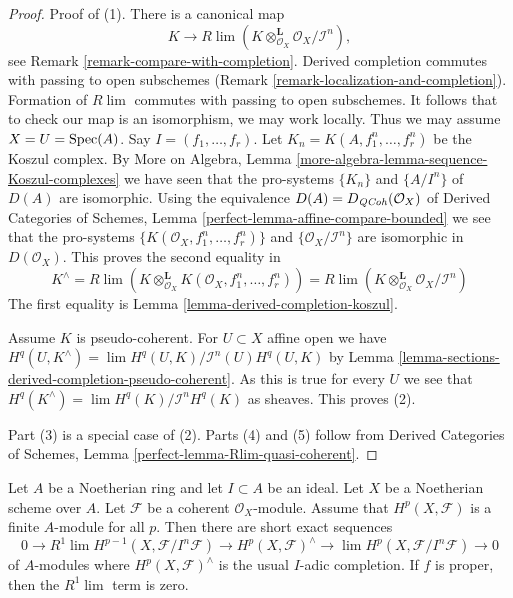 \begin{proof}
Proof of (1). There is a canonical map
$$
K \longrightarrow
R\lim (K \otimes_{\mathcal{O}_X}^\mathbf{L} \mathcal{O}_X/\mathcal{I}^n),
$$
see Remark \ref{remark-compare-with-completion}.
Derived completion commutes with passing to open subschemes
(Remark \ref{remark-localization-and-completion}).
Formation of $R\lim$ commutes with passing to open subschemes.
It follows that to check our map is an isomorphism, we may work locally.
Thus we may assume $X = U = \mathop{\mathrm{Spec}}(A)$.
Say $I = (f_1, \ldots, f_r)$. Let
$K_n = K(A, f_1^n, \ldots, f_r^n)$ be the Koszul complex.
By More on Algebra, Lemma \ref{more-algebra-lemma-sequence-Koszul-complexes}
we have seen that the pro-systems $\{K_n\}$ and
$\{A/I^n\}$ of $D(A)$ are isomorphic.
Using the equivalence $D(A) = D_{\mathit{QCoh}}(\mathcal{O}_X)$
of Derived Categories of Schemes, Lemma
\ref{perfect-lemma-affine-compare-bounded}
we see that the pro-systems $\{K(\mathcal{O}_X, f_1^n, \ldots, f_r^n)\}$
and $\{\mathcal{O}_X/\mathcal{I}^n\}$ are isomorphic in
$D(\mathcal{O}_X)$. This proves the second equality in
$$
K^\wedge = R\lim \left(
K \otimes_{\mathcal{O}_X}^\mathbf{L} K(\mathcal{O}_X, f_1^n, \ldots, f_r^n)
\right) =
R\lim (K \otimes_{\mathcal{O}_X}^\mathbf{L} \mathcal{O}_X/\mathcal{I}^n)
$$
The first equality is
Lemma \ref{lemma-derived-completion-koszul}.

\medskip\noindent
Assume $K$ is pseudo-coherent. For $U \subset X$ affine open
we have $H^q(U, K^\wedge) = \lim H^q(U, K)/\mathcal{I}^n(U)H^q(U, K)$
by Lemma \ref{lemma-sections-derived-completion-pseudo-coherent}.
As this is true for every $U$ we see that
$H^q(K^\wedge) = \lim H^q(K)/\mathcal{I}^nH^q(K)$ as sheaves.
This proves (2).

\medskip\noindent
Part (3) is a special case of (2).
Parts (4) and (5) follow from
Derived Categories of Schemes, Lemma
\ref{perfect-lemma-Rlim-quasi-coherent}.
\end{proof}

\begin{lemma}
\label{lemma-formal-functions}
Let $A$ be a Noetherian ring and let $I \subset A$ be an ideal. Let $X$ be a
Noetherian scheme over $A$. Let $\mathcal{F}$ be a coherent
$\mathcal{O}_X$-module. Assume that $H^p(X, \mathcal{F})$ is
a finite $A$-module for all $p$. Then there are short exact sequences
$$
0 \to R^1\lim H^{p - 1}(X, \mathcal{F}/I^n\mathcal{F}) \to
H^p(X, \mathcal{F})^\wedge \to \lim H^p(X, \mathcal{F}/I^n\mathcal{F}) \to 0
$$
of $A$-modules where $H^p(X, \mathcal{F})^\wedge$ is the usual $I$-adic
completion. If $f$ is proper, then the $R^1\lim$ term is zero.
\end{lemma}

